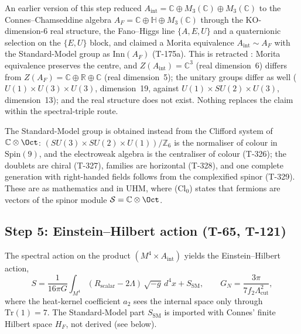 An earlier version of this step reduced $A_{\mathrm{int}} = \mathbb{C} \oplus
M_3(\mathbb{C}) \oplus M_3(\mathbb{C})$ to the Connes--Chamseddine algebra
$A_F = \mathbb{C} \oplus \mathbb{H} \oplus M_3(\mathbb{C})$ through the KO-dimension-6 real
structure, the Fano--Higgs line $\{A,E,U\}$ and a quaternionic selection on the
$\{E,U\}$ block, and claimed a Morita equivalence $A_{\mathrm{int}} \sim A_F$ with the
Standard-Model group as $\mathrm{Inn}(A_F)$ (T-175a). This is retracted \status{$\times$}:
Morita equivalence preserves the centre, and $Z(A_{\mathrm{int}}) = \mathbb{C}^3$ (real
dimension~6) differs from $Z(A_F) = \mathbb{C} \oplus \mathbb{R} \oplus \mathbb{C}$ (real
dimension~5); the unitary groups differ as well ($U(1)\times U(3)\times U(3)$, dimension~19,
against $U(1)\times SU(2)\times U(3)$, dimension~13); and the real structure does not exist.
Nothing replaces the claim within the spectral-triple route.

The Standard-Model group is obtained instead from the Clifford system of
$\mathbb{C}\otimes\Oct$: $(SU(3)\times SU(2)\times U(1))/\mathbb{Z}_6$ is the normaliser of
colour in $\mathrm{Spin}(9)$, and the electroweak algebra is the centraliser of colour
(T-326); the doublets are chiral (T-327), families are horizontal (T-328), and one complete
generation with right-handed fields follows from the complexified spinor (T-329). These are
 as mathematics and  in UHM, where (Cl$_0$) states that fermions
are vectors of the spinor module $\mathcal{S} = \mathbb{C}\otimes\Oct$.

\subsection{Step 5: Einstein--Hilbert action (T-65, T-121)}

\begin{theorembox}
The spectral action on the product $(M^4 \times A_{\mathrm{int}})$ yields the
Einstein--Hilbert action,
\begin{equation}
  S = \frac{1}{16\pi G}\int_{M^4} (R_{\mathrm{scalar}} - 2\Lambda)\,\sqrt{-g}\,d^4x
  + S_{\mathrm{SM}},
  \qquad G_N = \frac{3\pi}{7 f_2 \Lambda_{\mathrm{cut}}^2},
  \label{eq:einstein-hilbert}
\end{equation}
where the heat-kernel coefficient $a_2$ sees the internal space only through
$\mathrm{Tr}(1) = 7$. The Standard-Model part $S_{\mathrm{SM}}$ is imported with
Connes' finite Hilbert space $H_F$, not derived (see below).
\end{theorembox}

